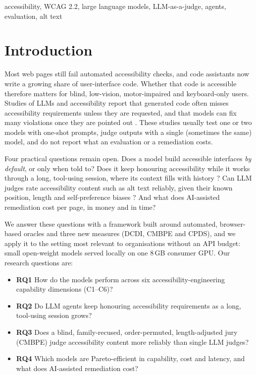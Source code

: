 \documentclass[conference]{IEEEtran}
\begin{document}
\begin{IEEEkeywords}
accessibility, WCAG 2.2, large language models, LLM-as-a-judge, agents, evaluation, alt text
\end{IEEEkeywords}

\section{Introduction}

Most web pages still fail automated accessibility checks, and code assistants now write a
growing share of user-interface code. Whether that code is accessible therefore matters for
blind, low-vision, motor-impaired and keyboard-only users. Studies of LLMs and accessibility
report that generated code often misses accessibility requirements unless they are requested,
and that models can fix many violations once they are pointed out
\cite{aljedaani2024chatgpt,mowar2025codea11y}. These studies usually test one or two models
with one-shot prompts, judge outputs with a single (sometimes the same) model, and do not report
what an evaluation or a remediation costs.

Four practical questions remain open. Does a model build accessible interfaces
\emph{by default}, or only when told to? Does it keep honouring accessibility while it works
through a long, tool-using session, where its context fills with history
\cite{liu2024lost,hsieh2024ruler}? Can LLM judges rate accessibility content such as alt text
reliably, given their known position, length and self-preference biases
\cite{zheng2023judging,wang2024fair,panickssery2024self}? And what does AI-assisted remediation
cost per page, in money and in time?

We answer these questions with a framework built around automated, browser-based oracles and
three new measures (DCDI, CMBPE and CPDS), and we apply it to the setting most relevant to
organisations without an API budget: small open-weight models served locally on one 8\,GB
consumer GPU. Our research questions are:
\begin{itemize}
\item \textbf{RQ1} How do the models perform across six accessibility-engineering capability
  dimensions (C1--C6)?
\item \textbf{RQ2} Do LLM agents keep honouring accessibility requirements as a long,
  tool-using session grows?
\item \textbf{RQ3} Does a blind, family-recused, order-permuted, length-adjusted jury (CMBPE)
  judge accessibility content more reliably than single LLM judges?
\item \textbf{RQ4} Which models are Pareto-efficient in capability, cost and latency, and what
  does AI-assisted remediation cost?
\end{itemize}
\end{document}

